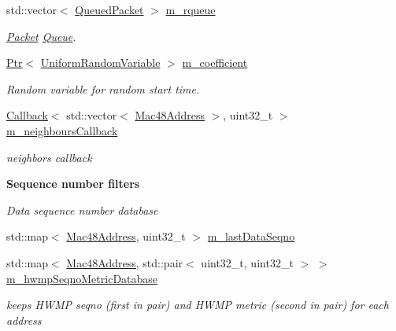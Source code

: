 \begin{DoxyCompactItemize}
std\+::vector$<$ \hyperlink{structns3_1_1dot11s_1_1HwmpProtocol_1_1QueuedPacket}{Queued\+Packet} $>$ \hyperlink{classns3_1_1dot11s_1_1HwmpProtocol_ad7a0b41b6f5ec7583e8fbda2197d345f}{m\+\_\+rqueue}
\begin{DoxyCompactList}\small\item\em \hyperlink{classns3_1_1Packet}{Packet} \hyperlink{classns3_1_1Queue}{Queue}. \end{DoxyCompactList}\item 
\hyperlink{classns3_1_1Ptr}{Ptr}$<$ \hyperlink{classns3_1_1UniformRandomVariable}{Uniform\+Random\+Variable} $>$ \hyperlink{classns3_1_1dot11s_1_1HwmpProtocol_a98cc0055f6be5f3837c2b32d4cfa641e}{m\+\_\+coefficient}
\begin{DoxyCompactList}\small\item\em Random variable for random start time. \end{DoxyCompactList}\item 
\hyperlink{classns3_1_1Callback}{Callback}$<$ std\+::vector$<$ \hyperlink{classns3_1_1Mac48Address}{Mac48\+Address} $>$, uint32\+\_\+t $>$ \hyperlink{classns3_1_1dot11s_1_1HwmpProtocol_ad8bb3f68346a8e1acd32efb30dcefa5b}{m\+\_\+neighbours\+Callback}
\begin{DoxyCompactList}\small\item\em neighbors callback \end{DoxyCompactList}\end{DoxyCompactItemize}
\begin{Indent}{\bf Sequence number filters}\par
{\em Data sequence number database }\begin{DoxyCompactItemize}
\item 
std\+::map$<$ \hyperlink{classns3_1_1Mac48Address}{Mac48\+Address}, uint32\+\_\+t $>$ \hyperlink{classns3_1_1dot11s_1_1HwmpProtocol_aeb887a8a8e95dcfc1ed9f37cbbe1a97c}{m\+\_\+last\+Data\+Seqno}
\item 
std\+::map$<$ \hyperlink{classns3_1_1Mac48Address}{Mac48\+Address}, std\+::pair$<$ uint32\+\_\+t, uint32\+\_\+t $>$ $>$ \hyperlink{classns3_1_1dot11s_1_1HwmpProtocol_afcff65dd692f7524ea04f46d2cfc7990}{m\+\_\+hwmp\+Seqno\+Metric\+Database}
\begin{DoxyCompactList}\small\item\em keeps H\+W\+MP seqno (first in pair) and H\+W\+MP metric (second in pair) for each address \end{DoxyCompactList}\end{DoxyCompactItemize}
\end{Indent}
